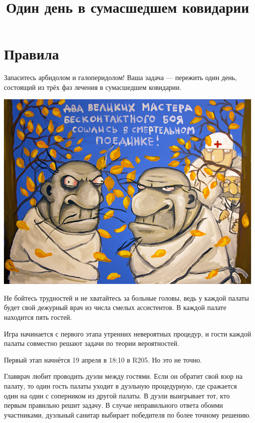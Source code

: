 \documentclass[12pt]{article}
\title{Один день в сумасшедшем ковидарии}
\date{}
\begin{document}
	\maketitle

\section*{Правила}

Запаситесь арбидолом и галоперидолом! Ваша задача — пережить один день, состоящий из трёх фаз лечения в сумасшедшем ковидарии.

\begin{center}
\includegraphics[scale=4]{images/lozhkin.jpg}
\end{center}

Не бойтесь трудностей и не хватайтесь за больные головы, 
ведь у каждой палаты будет свой дежурный врач из числа смелых ассистентов. В каждой палате находится пять гостей. 

Игра начинается с первого этапа утренних невероятных процедур, и гости каждой палаты совместно решают задачи по теории вероятностей. 

Первый этап начнётся 19 апреля в 18:10 в  R205. Но это не точно. 

Главврач любит проводить дуэли между гостями. 
Если он обратит свой взор на палату, то 
один гость палаты уходит в дуэльную процедурную, 
где сражается один на один с соперником из другой палаты. 
В дуэли выигрывает тот, кто первым правильно решит задачу. 
В случае неправильного ответа обоими участниками, дуэльный санитар выбирает победителя по более точному решению.
\end{document}
